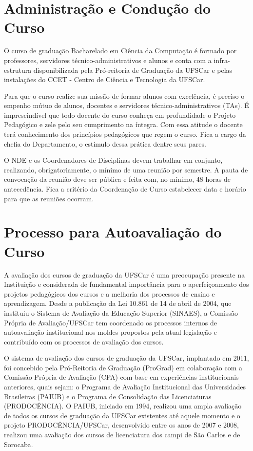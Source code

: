 \section{Administração e Condução do Curso}

O curso de graduação Bacharelado em Ciência da Computação é formado por professores, servidores técnico-administrativos e alunos e conta com a infra-estrutura disponibilizada pela Pró-reitoria de Graduação da UFSCar e pelas instalações do CCET - Centro de Ciência e Tecnologia da UFSCar.

Para que o curso realize sua missão de formar alunos com excelência, é preciso o empenho mútuo de alunos, docentes e servidores técnico-administrativos (TAs).
É imprescindível que todo docente do curso conheça em profundidade o Projeto Pedagógico e zele pelo seu cumprimento na íntegra. Com essa atitude o docente terá conhecimento dos princípios pedagógicos que regem o curso.  Fica a cargo da chefia do Departamento, o estímulo dessa prática dentre seus pares.

O NDE e os Coordenadores de Disciplinas devem trabalhar em conjunto, realizando, obrigatoriamente, o mínimo de uma reunião por semestre. A pauta de convocação da reunião deve ser pública e feita com, no mínimo, 48 horas de antecedência. Fica a critério da Coordenação de Curso estabelecer data e horário para que as reuniões ocorram. 

\section{Processo para Autoavaliação do Curso}

A avaliação dos cursos de graduação da UFSCar é uma preocupação presente na Instituição e considerada de fundamental importância para o aperfeiçoamento dos projetos pedagógicos dos cursos e a melhoria dos processos de ensino e aprendizagem. Desde a publicação da Lei 10.861 de 14 de abril de 2004, que instituiu o Sistema de Avaliação da Educação Superior (SINAES), a Comissão Própria de Avaliação/UFSCar tem coordenado os processos internos de autoavaliação institucional nos moldes propostos pela atual legislação e contribuído com os processos de avaliação dos cursos. 

O sistema de avaliação dos cursos de graduação da UFSCar, implantado em 2011, foi concebido pela Pró-Reitoria de Graduação (ProGrad) em colaboração com a Comissão Própria de Avaliação (CPA) com base em experiências institucionais anteriores, quais sejam: o Programa de Avaliação Institucional das Universidades Brasileiras (PAIUB)	 e o Programa de Consolidação	das Licenciaturas (PRODOCÊNCIA). O PAIUB, iniciado em 1994, realizou uma ampla avaliação de todos os cursos de graduação da UFSCar existentes até aquele momento e o projeto PRODOCÊNCIA/UFSCar, desenvolvido entre os anos de 2007 e 2008, realizou uma avaliação dos cursos de licenciatura dos campi de São Carlos e de Sorocaba. 

